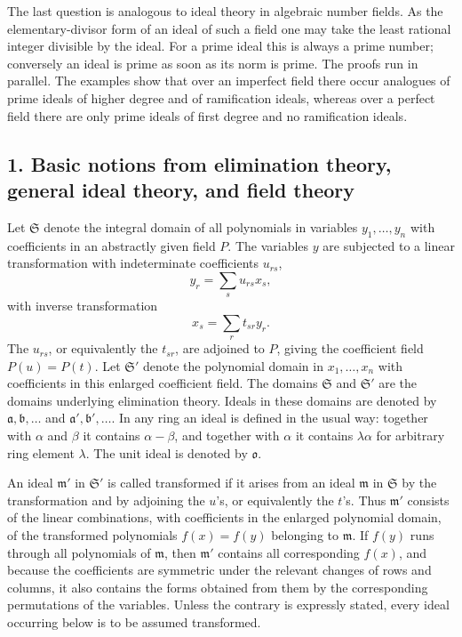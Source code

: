 \documentclass[11pt]{article}
\begin{document}
The last question is analogous to ideal theory in algebraic number fields. As the elementary-divisor form of an ideal of such a field one may take the least rational integer divisible by the ideal. For a prime ideal this is always a prime number; conversely an ideal is prime as soon as its norm is prime. The proofs run in parallel. The examples show that over an imperfect field there occur analogues of prime ideals of higher degree and of ramification ideals, whereas over a perfect field there are only prime ideals of first degree and no ramification ideals.

\subsection{1. Basic notions from elimination theory, general ideal theory, and field theory}

Let $\mathfrak S$ denote the integral domain of all polynomials in variables $y_1,\ldots,y_n$ with coefficients in an abstractly given field $P$. The variables $y$ are subjected to a linear transformation with indeterminate coefficients $u_{rs}$,
\[
  y_r=\sum_s u_{rs}x_s,
\]
with inverse transformation
\[
  x_s=\sum_r t_{sr}y_r.
\]
The $u_{rs}$, or equivalently the $t_{sr}$, are adjoined to $P$, giving the coefficient field $P(u)=P(t)$. Let $\mathfrak S'$ denote the polynomial domain in $x_1,\ldots,x_n$ with coefficients in this enlarged coefficient field. The domains $\mathfrak S$ and $\mathfrak S'$ are the domains underlying elimination theory. Ideals in these domains are denoted by $\mathfrak a,\mathfrak b,\ldots$ and $\mathfrak a',\mathfrak b',\ldots$. In any ring an ideal is defined in the usual way: together with $\alpha$ and $\beta$ it contains $\alpha-\beta$, and together with $\alpha$ it contains $\lambda\alpha$ for arbitrary ring element $\lambda$. The unit ideal is denoted by $\mathfrak o$.

An ideal $\mathfrak m'$ in $\mathfrak S'$ is called transformed if it arises from an ideal $\mathfrak m$ in $\mathfrak S$ by the transformation and by adjoining the $u$'s, or equivalently the $t$'s. Thus $\mathfrak m'$ consists of the linear combinations, with coefficients in the enlarged polynomial domain, of the transformed polynomials $f(x)=f(y)$ belonging to $\mathfrak m$. If $f(y)$ runs through all polynomials of $\mathfrak m$, then $\mathfrak m'$ contains all corresponding $f(x)$, and because the coefficients are symmetric under the relevant changes of rows and columns, it also contains the forms obtained from them by the corresponding permutations of the variables. Unless the contrary is expressly stated, every ideal occurring below is to be assumed transformed.
\end{document}
